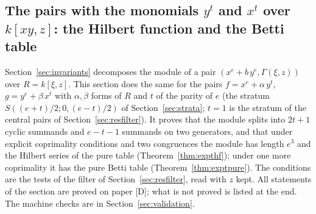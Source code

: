 \documentclass[11pt]{article}
\theoremstyle{definition}
\theoremstyle{remark}
\begin{document}
\subsection{The pairs with the monomials \texorpdfstring{$y^t$ and $x^t$}{y(t) and x(t)} over \texorpdfstring{$k[xy,z]$}{k[xy,z]}: the Hilbert function and the Betti table}
\label{sec:expt}

Section~\ref{sec:invariants} decomposes the module of a pair $(x^e+b\,y^e,\Gamma(\xi,z))$ over $R=k[\xi,z]$. This section does the same for the pairs $f=x^e+\alpha\,y^t$, $g=y^e+\beta\,x^t$ with $\alpha,\beta$ forms of $R$ and $t$ of the parity of $e$ (the stratum $S((e+t)/2;0,(e-t)/2)$ of Section~\ref{sec:strata}; $t=1$ is the stratum of the central pairs of Section~\ref{sec:resfilter}). It proves that the module splits into $2t+1$ cyclic summands and $e-t-1$ summands on two generators, and that under explicit coprimality conditions and two congruences the module has length $e^3$ and the Hilbert series of the pure table (Theorem~\ref{thm:expthf}); under one more coprimality it has the pure Betti table (Theorem~\ref{thm:exptpure}). The conditions are the tests of the filter of Section~\ref{sec:resfilter}, read with $z$ kept. All statements of the section are proved on paper [D]; what is not proved is listed at the end. The machine checks are in Section~\ref{sec:validation}.
\end{document}
